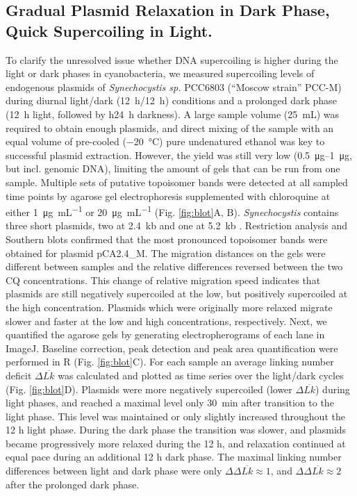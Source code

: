 \documentclass[10pt,a4]{article}
\def\cite#1{\hypersetup{citecolor=Teal}\citep{#1}} %
\newcommand{\ugml}{\micro\gram\per\milli\liter}
\newcommand{\mL}{\milli\liter}
\newcommand{\scyst}{\textit{Synechocystis}}
\newcommand{\remove}[1]{\begingroup\color{gray}\endgroup}
\begin{document}
\subsection{Gradual Plasmid Relaxation in Dark Phase, Quick Supercoiling in
  Light.}

To clarify the unresolved issue whether DNA supercoiling is higher
during the light or dark phases in cyanobacteria, we measured
supercoiling levels of endogenous plasmids of \textit{Synechocystis
  sp.} PCC6803 (``Moscow strain'' PCC-M) \remove{and
  \textit{Synechococcus elongatus} PCC 7942} during diurnal light/dark
(\SI{12}{\hour}/\SI{12}{\hour}) conditions and a prolonged dark phase
(\SI{12}{\hour} light, followed by h\SI{24}{\hour} darkness).  A large
sample volume (\SI{25}{\mL}) was required to obtain enough plasmids,
and direct mixing of the sample with an equal volume of pre-cooled
(\SI{-20}{\celsius}) pure undenatured ethanol was key to successful
plasmid extraction. However, the yield was still very low
(\SIrange{0.5}{1}{\ug}, but incl. genomic DNA), limiting the amount of
gels that can be run from one sample.
%
Multiple sets of putative topoisomer bands were detected at all
sampled time points by agarose gel electrophoresis supplemented with
chloroquine at either \SI{1}{\ugml} or \SI{20}{\ugml}
(Fig. \ref{fig:blot}A, B). \scyst{} contains three short plasmids, two
at \SI{2.4}{kb} \cite{Yang1993b, Yang1994} and one at \SI{5.2}{kb}
\cite{Xu1997b}. Restriction analysis and Southern blots confirmed that
the most pronounced topoisomer bands were obtained for plasmid
pCA2.4\_M.
%
The migration distances on the gels were different between samples and
the relative differences reversed between the two CQ
concentrations. This change of relative migration speed indicates that
plasmids are still negatively supercoiled at the low, but positively
supercoiled at the high concentration. Plasmids which were originally
more relaxed migrate slower and faster at the low and high
concentrations, respectively.  \remove{Topo I relaxation time series
  of pooled samples from light and dark phases further confirmed that
  more relaxed plasmids migrate faster at the high CQ concentration
  (Fig. \ref{fig:topoi}A).}
%
Next, we quantified the agarose gels by generating electropherograms
of each lane in ImageJ. Baseline correction, peak detection and peak
area quantification were performed in R (Fig. \ref{fig:blot}C). For
each sample an average linking number deficit $\Delta \overline{Lk}$
was calculated and plotted as time series over the light/dark cycles
(Fig. \ref{fig:blot}D).  Plasmids were more negatively supercoiled
(lower $\Delta \overline{Lk}$) during light phases, and reached a
maximal level only \SI{30}{\minute} after transition to the light
phase. This level was maintained or only slightly increased throughout
the 12 h light phase.  During the dark phase the transition was
slower, and plasmids became progressively more relaxed during the 12
h, and relaxation continued at equal pace during an additional 12 h
dark phase.
%
The maximal linking number differences between light and dark phase
were only $\Delta \Delta \overline{Lk} \approx 1$, and $\Delta \Delta
\overline{Lk} \approx 2$ after the prolonged dark phase.
\end{document}

